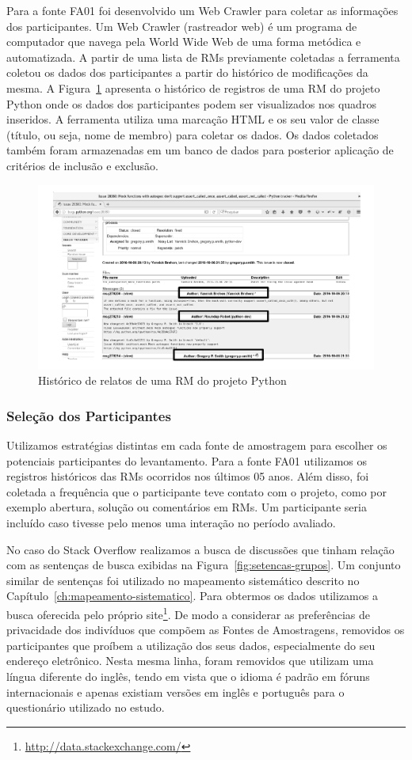 Para a fonte FA01 foi desenvolvido um Web Crawler para coletar as informações
dos participantes. Um Web Crawler (rastreador web) é um programa de computador
que navega pela World Wide Web de uma forma metódica e automatizada. A partir
de uma lista de RMs previamente coletadas a ferramenta coletou os dados dos
participantes a partir do histórico de modificações da mesma. A
Figura~\ref{fig:historico-rm-python} apresenta o histórico de registros de uma
RM do projeto Python onde os dados dos participantes podem ser visualizados nos
quadros inseridos. A ferramenta utiliza uma marcação HTML e os seu valor de
classe (título, ou seja, nome de membro) para coletar os dados. Os dados
coletados também foram armazenadas em um banco de dados para posterior aplicação
de critérios de inclusão e exclusão.

\begin{figure}[htpb]
	\centering
	\includegraphics[width=0.5\linewidth]{./chapter-pesquisa-com-profissionais/img/historico-rm-python.pdf}
	\caption{Histórico de relatos de uma RM do projeto Python}
\label{fig:historico-rm-python}
\end{figure}

\subsubsection{Seleção dos Participantes}
\label{subsubsec:pesquisa_profissionais_plano_pesquisa}

Utilizamos estratégias distintas em cada fonte de amostragem para escolher os
potenciais participantes do levantamento. Para a fonte FA01 utilizamos os
registros históricos das RMs ocorridos nos últimos 05 anos. Além disso, foi
coletada a frequência que o participante teve contato com o projeto, como por
exemplo abertura, solução ou comentários em RMs. Um participante seria incluído
caso tivesse pelo menos uma interação no período avaliado.

No caso do Stack Overflow realizamos a busca de discussões que tinham relação
com as sentenças de busca exibidas na Figura~\ref{fig:setencas-grupos}. Um
conjunto similar de sentenças foi utilizado no mapeamento sistemático descrito
no Capítulo~\ref{ch:mapeamento-sistematico}. Para obtermos os dados utilizamos a
busca oferecida pelo próprio
site\footnote{\url{http://data.stackexchange.com/}}. De modo a considerar as
preferências de privacidade dos indivíduos que compõem as Fontes de Amostragens,
removidos os participantes que proíbem a utilização dos seus dados,
especialmente do seu endereço eletrônico. Nesta mesma linha, foram removidos que
utilizam uma língua diferente do inglês, tendo em vista que o idioma é padrão em
fóruns internacionais e apenas existiam versões em inglês e português para o
questionário utilizado no estudo.

